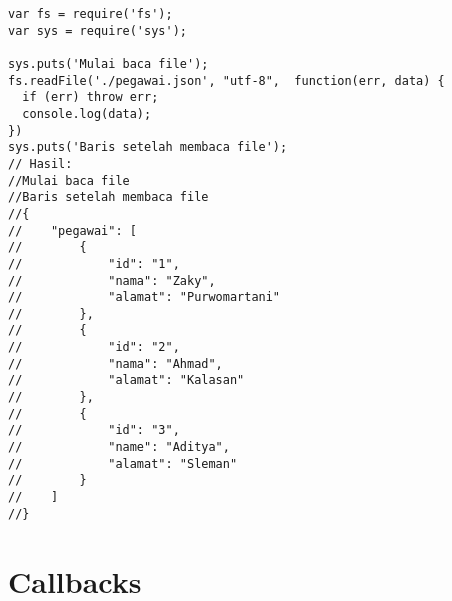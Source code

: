 \lstset{language=JavaScript,caption=Membaca file secara asynchronous}
\begin{lstlisting}
var fs = require('fs');
var sys = require('sys');

sys.puts('Mulai baca file');
fs.readFile('./pegawai.json', "utf-8",  function(err, data) {
  if (err) throw err;
  console.log(data);
})
sys.puts('Baris setelah membaca file');
// Hasil:
//Mulai baca file
//Baris setelah membaca file
//{
//    "pegawai": [
//        {
//            "id": "1",
//            "nama": "Zaky",
//            "alamat": "Purwomartani"
//        },
//        {
//            "id": "2",
//            "nama": "Ahmad",
//            "alamat": "Kalasan"
//        },
//        {
//            "id": "3",
//            "name": "Aditya",
//            "alamat": "Sleman"
//        }
//    ]
//}
\end{lstlisting}


\section{Callbacks}

